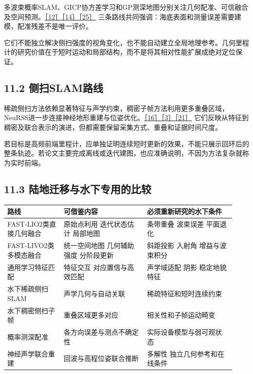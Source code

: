 多波束概率SLAM、GICP协方差学习和GP测深地图分别关注几何配准、可信融合及空间预测。\href{https://pmc.ncbi.nlm.nih.gov/articles/PMC4851074/}{［12］}\href{https://arxiv.org/abs/2003.10931}{［14］}\href{https://arxiv.org/abs/2203.10893}{［25］} 三条路线共同强调：海底表面和测量误差需要建模，配准残差不是唯一评价。

它们不能独立解决侧扫强度的视角变化，也不能自动建立全局地理参考。几何里程计的研究价值在于短时运动和局部结构，而不是将其相对性能扩展成绝对定位保证。

\hypertarget{ux4fa7ux626bslamux8defux7ebf}{%
\subsection{11.2 侧扫SLAM路线}\label{ux4fa7ux626bslamux8defux7ebf}}

稀疏侧扫方法依赖显著特征与声学约束，稠密子帧方法利用更多重叠区域，NeuRSS进一步连接神经地形重建与位姿优化。\href{https://arxiv.org/abs/2304.01854}{［16］}\href{https://arxiv.org/abs/2312.13802}{［3］}\href{https://arxiv.org/abs/2405.05807}{［21］} 它们反映从特征到稠密及联合表示的演进，但都需要保留采集方式、重叠和证据时间尺度。

若目标是高频前端里程计，应单独证明连续短时更新的效果，不能只展示回环后的整条轨迹。若论文主要完成离线或迭代建图，也应准确说明，不因为方法复杂就称为实时前端。

\hypertarget{ux9646ux5730ux8fc1ux79fbux4e0eux6c34ux4e0bux4e13ux7528ux7684ux6bd4ux8f83}{%
\subsection{11.3 陆地迁移与水下专用的比较}\label{ux9646ux5730ux8fc1ux79fbux4e0eux6c34ux4e0bux4e13ux7528ux7684ux6bd4ux8f83}}

\begin{longtable}[]{@{}p{0.23\linewidth}p{0.34\linewidth}p{0.36\linewidth}@{}}
\toprule
路线 & 可借鉴内容 & 必须重新研究的水下条件\tabularnewline
\midrule
\endhead
FAST-LIO2类直接几何融合 & 原始点利用 迭代状态估计 局部地图 & 条带重叠 波束误差 平面退化\tabularnewline
FAST-LIVO2类多模态融合 & 统一空间地图 几何辅助强度 分阶段更新 & 斜距投影 入射角 增益与波束积分\tabularnewline
通用学习特征匹配 & 特征交互 对应置信与高效匹配 & 声学域适配 阴影 稳定地貌特征\tabularnewline
水下稀疏侧扫SLAM & 声学几何与自动关联 & 稀疏特征和短时连续约束\tabularnewline
水下稠密侧扫子帧 & 重叠区域更多对应 & 相关性和子帧运动畸变\tabularnewline
概率测深配准 & 各方向误差与测点不确定性 & 实际设备模型与弱可观状态\tabularnewline
神经声学联合重建 & 回波与高程位姿联合推断 & 多解性 独立几何参考和在线条件\tabularnewline
\bottomrule
\end{longtable}

